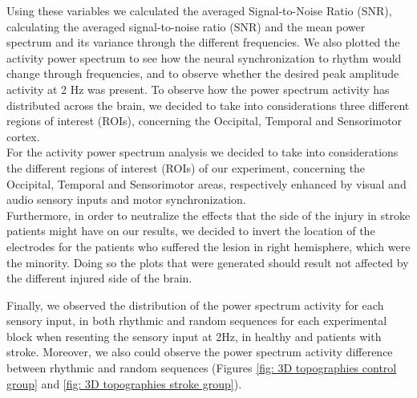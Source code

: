 Using these variables we calculated the averaged Signal-to-Noise Ratio (SNR), calculating the averaged signal-to-noise ratio (SNR) and the mean power spectrum and its variance through the different frequencies. We also plotted the activity power spectrum to see how the neural synchronization to rhythm would change through frequencies, and to observe whether the desired peak amplitude activity at 2 Hz was present. To observe how the  power spectrum activity has distributed across the brain, we decided to take into considerations three different regions of interest (ROIs), concerning the Occipital, Temporal and Sensorimotor cortex. \\
For the activity power spectrum analysis we decided to take into considerations the different regions of interest (ROIs) of our experiment, concerning the Occipital, Temporal and Sensorimotor areas, respectively enhanced by visual and audio sensory inputs and motor synchronization. \\
Furthermore, in order to neutralize the effects that the side of the injury in stroke patients might have on our results, we decided to invert the location of the electrodes for the patients who suffered the lesion in right hemisphere, which were the minority. Doing so the plots that were generated should result not affected by the different injured side of the brain.  

Finally, we observed  the distribution of the power spectrum activity for each sensory input, in both rhythmic and random sequences for each experimental block when resenting the sensory input at 2Hz, in healthy and patients with stroke. Moreover, we also could observe the power spectrum activity difference between rhythmic and random sequences (Figures \ref{fig: 3D topographies control group} and \ref{fig: 3D topographies stroke group}). 

